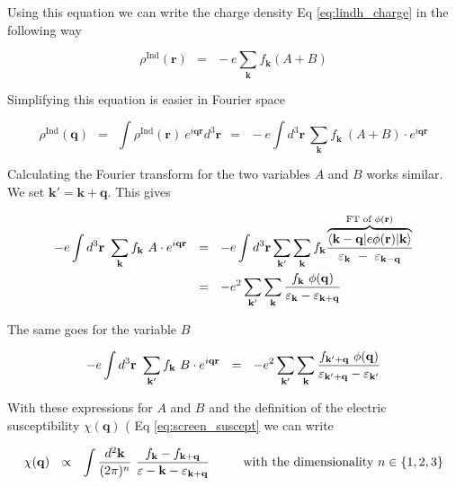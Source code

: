 \documentclass[10pt]{report}
\numberwithin{equation}{chapter}
\newcommand{\refEq}[1]{
  Eq  \ref{#1}
}
\newcommand{\vc}[1]{ %
  \mathbf{#1}
}
\begin{document}
Using this equation we can write the charge density \refEq{eq:lindh_charge} in the following way

\begin{equation}
  \rho^\text{Ind}(\mathbf{r}) ~~=~~ -e \sum_{\mathbf{k}} f_\mathbf{k} (A+B)
\end{equation}


Simplifying this equation is easier in Fourier space

\begin{equation}
  \rho^\text{Ind}(\mathbf{q}) ~~=~~ \int \rho^\text{Ind}(\mathbf{r})\ e^{i\mathbf{q} \mathbf{r}} d^3\mathbf{r} 
  ~~=~~ -e \int d^3\mathbf{r}\ \sum_\mathbf{k} f_\mathbf{k}\ (A+B) \cdot e^{i\mathbf{q} \mathbf{r}}
\end{equation}

Calculating the Fourier transform for the two variables $A$ and $B$ works similar. We set $\mathbf{k}' = \mathbf{k} + \mathbf{q}$. This gives

\begin{align}
  -e \int d^3\vc{r}\ \sum_\vc{k} f_\vc{k}\ A \cdot e^{i\vc{q}\vc{r}} 
  ~~& =~~ -e \int d^3 \vc{r} \sum_{\vc{k}'} \sum_\vc{k} f_\vc{k}
  \frac{\overbrace{\langle \vc{k}-\vc{q}| e\phi(\vc{r})|\vc{k}\rangle}^{\text{FT of } \phi(\vc{r})}}{\varepsilon_\vc{k} ~-~ \varepsilon_{\vc{k}-\vc{q}}} \nonumber \\
  ~~& =~~ -e^2 \sum_{\vc{k}'} \sum_\vc{k} \frac{f_\vc{k}\ \phi(\vc{q})}{\varepsilon_\vc{k} - \varepsilon_{\vc{k}+\vc{q}}}
\end{align}


The same goes for the variable $B$

\begin{equation}
  -e \int d^3\vc{r}\ \sum_{\vc{k}'} f_\vc{k}\ B \cdot e^{i\vc{q}\vc{r}} 
  ~~=~~ -e^2 \sum_{\vc{k}'} \sum_\vc{k} \frac{f_{\vc{k}'+\vc{q}}\ \phi(\vc{q})}{\varepsilon_{\vc{k}'+\vc{q}} - \varepsilon_{\vc{k}'}}
\end{equation}



With these expressions for $A$ and $B$ and the definition of the electric susceptibility $\chi(\vc{q})$ (\refEq{eq:screen_suscept} we can write

\begin{equation}
  \chi(\vc{q}) ~~\propto~~ \int \frac{d^2 \vc{k}}{(2\pi)^n}\ \frac{f_\vc{k} - f_{\vc{k}+\vc{q}}}{\varepsilon-\vc{k} - \varepsilon_{\vc{k}+\vc{q}}}
  ~~~~~~~~\text{with the dimensionality}~ n \in \{1,2,3\} 
\end{equation}
\end{document}
